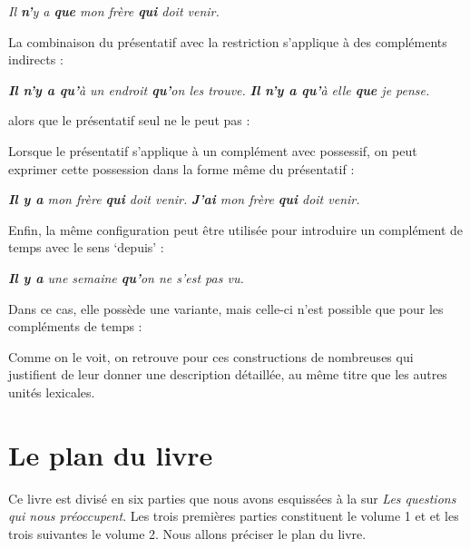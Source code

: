 {   \ea
    \textit{{Il} \textbf{{n’}}{y a} \textbf{{que}} {mon frère \textbf{qui} doit venir.}}
    \z

  \noindent  La combinaison du présentatif avec la restriction s’applique à des compléments indirects :

   \ea
   \ea   \textit{\textbf{{Il n’y} {a qu’}}{à un endroit} \textbf{{qu’}}{on les trouve.}}
   \ex   \textit{\textbf{{Il n’y} {a qu’}}{à elle} \textbf{{que}} {je pense.}}
   \z
   \z

 \noindent  alors que le présentatif seul ne le peut pas :

   \ea
   \z
   \z

  \noindent  Lorsque le présentatif s’applique à un complément avec possessif, on peut exprimer cette possession dans la forme même du présentatif :

   \ea
    \ea \textit{\textbf{{Il y a}} {mon frère} \textbf{{qui}} {doit venir.}}
    \ex \textit{\textbf{{J’ai}} {mon frère} \textbf{{qui}} {doit venir.}}
    \z
    \z

   \noindent Enfin, la même configuration peut être utilisée pour introduire un complément de temps avec le sens ‘depuis’ :

   \ea
    \textit{\textbf{{Il y a}} {une semaine} \textbf{{qu’}}{on ne s’est} {pas vu.}}
    \z

 \noindent   Dans ce cas, elle possède une variante, mais celle-ci n’est possible que pour les compléments de temps :

   \ea
   \z
   \z

   Comme on le voit, on retrouve pour ces constructions de nombreuses  qui justifient de leur donner une description détaillée, au même titre que les autres unités lexicales.}
   
\section{Le plan du livre}\label{sec:0.0.8}

Ce livre est divisé en six parties que nous avons esquissées à la  sur \textit{Les questions qui nous préoccupent}. Les trois premières parties constituent le volume 1 et et les trois suivantes le volume 2. Nous allons préciser le plan du livre.

